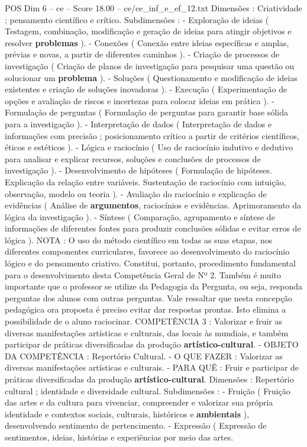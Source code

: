 \begin{textsample}{POS Dim 6 – ce – Score 18.00 – ce/ce\_inf\_e\_ef\_12.txt}
Dimensões : Criatividade ; pensamento científico e crítico.
Subdimensões : - Exploração de ideias ( Testagem, combinação, modificação e geração de ideias para atingir objetivos e resolver \textbf{problemas} ). - Conexões ( Conexão entre ideias específicas e amplas, prévias e novas, a partir de diferentes caminhos ). - Criação de processos de investigação ( Criação de planos de investigação para pesquisar uma questão ou solucionar um \textbf{problema} ). - Soluções ( Questionamento e modificação de ideias existentes e criação de soluções inovadoras ). - Execução ( Experimentação de opções e avaliação de riscos e incertezas para colocar ideias em prática ). - Formulação de perguntas ( Formulação de perguntas para garantir base sólida para a investigação ). - Interpretação de dados ( Interpretação de dados e informações com precisão ; posicionamento crítico a partir de critérios científicos, éticos e estéticos ). - Lógica e raciocínio ( Uso de raciocínio indutivo e dedutivo para analisar e explicar recursos, soluções e conclusões de processos de investigação ). - Desenvolvimento de hipóteses ( Formulação de hipóteses.
Explicação da relação entre variáveis.
Sustentação de raciocínio com intuição, observação, modelo ou teoria ). - Avaliação do raciocínio e explicação de evidências ( Análise de \textbf{argumentos}, raciocínios e evidências.
Aprimoramento da lógica da investigação ). - Síntese ( Comparação, agrupamento e síntese de informações de diferentes fontes para produzir conclusões sólidas e evitar erros de lógica ).
NOTA : O uso do método científico em todas as suas etapas, nos diferentes componentes curriculares, favorece ao desenvolvimento do raciocínio lógico e do pensamento criativo.
Constitui, portanto, procedimento fundamental para o desenvolvimento desta Competência Geral de Nº 2.
Também é muito importante que o professor se utilize da Pedagogia da Pergunta, ou seja, responda perguntas dos alunos com outras perguntas.
Vale ressaltar que nesta concepção pedagógica ora proposta é preciso evitar dar respostas prontas.
Isto elimina a possibilidade de o aluno raciocinar.
COMPETÊNCIA 3 : Valorizar e fruir as diversas manifestações artísticas e culturais, das locais às mundiais, e também participar de práticas diversificadas da produção \textbf{artístico-cultural}. - OBJETO DA COMPETÊNCIA : Repertório Cultural. - O QUE FAZER : Valorizar as diversas manifestações artísticas e culturais. - PARA QUÊ : Fruir e participar de práticas diversificadas da produção \textbf{artístico-cultural}.
Dimensões : Repertório cultural ; identidade e diversidade cultural.
Subdimensões : - Fruição ( Fruição das artes e da cultura para vivenciar, compreender e valorizar sua própria identidade e contextos sociais, culturais, históricos e \textbf{ambientais} ), desenvolvendo sentimento de pertencimento. - Expressão ( Expressão de sentimentos, ideias, histórias e experiências por meio das artes.

\end{textsample}
